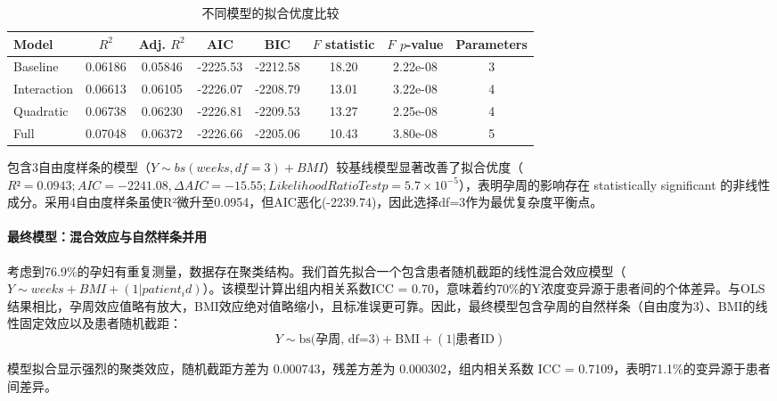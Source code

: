 \documentclass[withoutpreface]{cumcmthesis}
\begin{document}
\begin{table}[htbp]
    \centering
    \setlength{\tabcolsep}{4pt}
    \caption{不同模型的拟合优度比较}
    \label{tab:model_comparison}
    \begin{tabular}{l
				S[table-format=1.5]
				S[table-format=1.5]
				S[table-format=-4.4]
				S[table-format=-4.4]
				S[table-format=2.5]
				S[table-format=1.2e-2]
				c}
\toprule
        Model & {$R^2$} & {Adj. $R^2$} & {AIC} & {BIC} & {$F$ statistic} & {$F$ $p$-value} & {Parameters} \\
        \midrule
        Baseline    & 0.06186 & 0.05846 & -2225.53 & -2212.58 & 18.20 & 2.22e-08 & 3 \\
        Interaction & 0.06613 & 0.06105 & -2226.07 & -2208.79 & 13.01 & 3.22e-08 & 4 \\
        Quadratic   & 0.06738 & 0.06230 & -2226.81 & -2209.53 & 13.27 & 2.25e-08 & 4 \\
        Full        & 0.07048 & 0.06372 & -2226.66 & -2205.06 & 10.43 & 3.80e-08 & 5 \\
        \bottomrule
    \end{tabular}
\end{table}

包含3自由度样条的模型（$Y \sim bs(weeks, df=3) + BMI$）较基线模型显著改善了拟合优度（$R² = 0.0943; AIC = -2241.08, ΔAIC = -15.55; Likelihood Ratio Test p = 5.7\times 10^{-5}$），表明孕周的影响存在 statistically significant 的非线性成分。采用4自由度样条虽使R²微升至0.0954，但AIC恶化(-2239.74)，因此选择df=3作为最优复杂度平衡点。

\paragraph{最终模型：混合效应与自然样条并用}
考虑到76.9\%的孕妇有重复测量，数据存在聚类结构。我们首先拟合一个包含患者随机截距的线性混合效应模型（$Y \sim weeks + BMI + (1|patient_id)$）。该模型计算出组内相关系数ICC = 0.70，意味着约70\%的Y浓度变异源于患者间的个体差异。与OLS结果相比，孕周效应值略有放大，BMI效应绝对值略缩小，且标准误更可靠。因此，最终模型包含孕周的自然样条（自由度为3）、BMI的线性固定效应以及患者随机截距：
\begin{equation*}
Y \sim \text{bs(孕周, df=3)} + \text{BMI} + (1|\text{患者ID})
\end{equation*}

模型拟合显示强烈的聚类效应，随机截距方差为 \num{0.000743}，残差方差为 \num{0.000302}，组内相关系数 ICC = \num{0.7109}，表明71.1\%的变异源于患者间差异。
\end{document}
